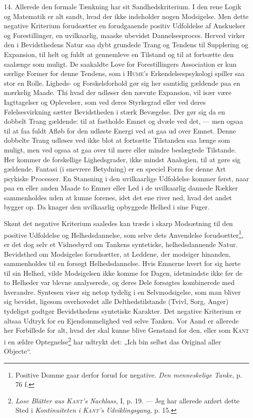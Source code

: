 \documentclass[12pt]{article}
\newcommand{\opage}[1]{\marginnote{\footnotesize\textit{[#1]}}}
\begin{document}
\setcounter{footnote}{0}%
\medskip
\opage{38}14. Allerede den formale Tænkning har sit Sandhedskriterium. I den
rene Logik og Matematik er alt sandt, hvad der ikke indeholder nogen
Modsigelse. Men dette negative Kriterium forudsætter en forudgaaende positiv
Udfoldelse af Anskuelser og Forestillinger, en uvilkaarlig, maaske ubevidst
Dannelsesproces. Herved virker den i Bevidsthedens Natur saa dybt grundede
Trang og Tendens til Supplering og Expansion, til helt og fuldt at gennemleve
en Tilstand og til at fortsætte den saalænge som muligt. De saakaldte Love for
Forestillingers Association er kun særlige Former for denne Tendens, som i
\textsc{Hume}'s Erkendelsespsykologi spiller saa stor en Rolle. Ligheds- og
Forskelsforhold gør sig her samtidig gældende paa en mærkelig Maade. Thi hvad
der udløser den nævnte Expansion, vil især være Iagttagelser og Oplevelser,
som ved deres Styrkegrad eller ved deres Følelsesvirkning sætter Bevidstheden i
stærk Bevægelse. Der gør sig da en dobbelt Trang gældende: til at fastholde
Emnet og dvæle ved det, --- men ogsaa til at faa fuldt Afløb for den udløste
Energi ved at gaa ud over Emnet. Denne dobbelte Trang udløses ved ikke blot at
fortsætte Tilstanden saa længe som muligt, men ved ogsaa at gaa over til mere
eller mindre beslægtede Tilstande. Her kommer de forskellige Lighedsgrader,
ikke mindst Analogien, til at gøre sig gældende. Fantasi (i snevrere
Betydning) er en speciel Form for denne Art psykiske Processer. En Stansning i
den uvilkaarlige Udfoldelse kommer først, naar paa en eller anden Maade to
Emner eller Led i de uvilkaarlig dannede Rækker sammenholdes uden at kunne
forenes, idet det ene river ned, hvad det andet bygger op. Da knager den
uvilkaarlig opbyggede Helhed i sine Fuger.

Skønt det negative Kriterium saaledes kan træde i skarp Modsætning til den
positive Udfoldelse og Helhedsdannelse, som selve dets Anvendelse
forudsætter\footnote{Positive Domme gaar derfor forud for negative.
\textit{Den menneskelige Tanke}, p. 76 f.}, er det dog selv et Vidnesbyrd om
Tankens syntetiske, helhedsdannende Natur. Bevidsthed om Modsigelse
forudsætter, at Leddene, der modsiger hinanden, sammenholdes til en forsøgt
Helhedsdannelse. Hvis Emnerne hvert for sig hørte til sin Helhed, vilde
Modsigelsen ikke komme for Dagen, idetmindste ikke før de to Helheder var
blevne analyserede, og deres Dele forsøgtes kombinerede med hverandre. Syntesen
viser sig netop tydelig i en Selvmodsigelse, som man bliver sig bevidst,
ligesom overhovedet alle Delthedstilstande (Tvivl, Sorg, Anger) tydeligst
godtgør Bevidsthedens syntetiske Karakter. Det negative Kriterium er altsaa
Udtryk for en Ejendommelighed ved selve Tanken. Vor Aand er allerede her
Forbillede for alt, hvad der skal kunne blive Genstand for den, eller som
\textsc{Kant} i en ældre Optegnelse\footnote{\textit{Lose Blätter aus
\textsc{Kant}'s Nachlass,} I, p. 19. --- Jeg har allerede anført dette Sted i
\textit{Kontinuiteten i \textsc{Kant}'s Udviklingsgang,} p. 15.} har udtrykt
det: „Ich bin selbst das Original aller Objecte“.
\end{document}
